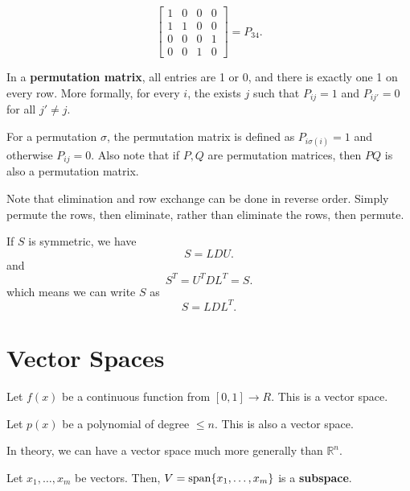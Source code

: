 \begin{eg}
	\[
		\begin{bmatrix}
			1 & 0 & 0 & 0 \\
			1 & 1 & 0 & 0 \\
			0 & 0 & 0 & 1 \\
			0 & 0 & 1 & 0 
		\end{bmatrix} = P_{34}
	.\] 
\end{eg}

\begin{definition}
	In a \textbf{permutation matrix}, all entries are 1 or 0, and there is exactly one 1 on every row. More formally, for every \( i \), the exists \( j \) such that \( P_{ij}= 1 \) and \( P_{ij'}= 0 \) for all \( j' \neq  j \).
\end{definition}

For a permutation \( \sigma  \), the permutation matrix is defined as \( P_{i\sigma (i)}=1 \) and otherwise \( P_{ij}= 0 \). Also note that if \( P,Q \) are permutation matrices, then \( PQ \) is also a permutation matrix.

Note that elimination and row exchange can be done in reverse order. Simply permute the rows, then eliminate, rather than eliminate the rows, then permute.

\begin{prop}
	If \( S \) is symmetric, we have \[
		S = LDU
	.\] and \[
		S^{T} = U^{T} D L^{T}  = S
	.\] which means we can write \( S \) as \[
		S = L D L^{T} 
	.\] 
\end{prop}

\section{Vector Spaces}

\begin{eg}
	Let \( f(x) \) be a continuous function from \( [0,1]\to R \). This is a vector space.
\end{eg}

\begin{eg}
	Let \( p(x)  \) be a polynomial of degree \( \le n \). This is also a vector space.
\end{eg}

In theory, we can have a vector space much more generally than \( \mathbb{R}^{n}  \). 

\begin{definition}
	Let \( x_{1},\ldots ,x_m \) be vectors. Then, \( V = \operatorname{span}\{x_{1},\ldots ,x_m\}   \) is a \textbf{subspace}.
\end{definition}

